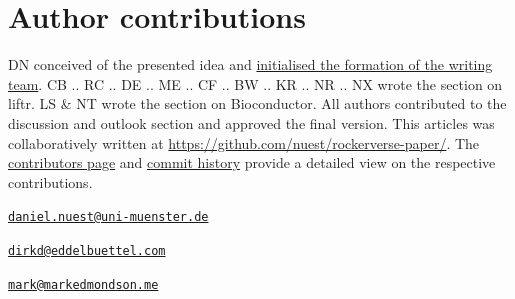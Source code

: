 \hypertarget{author-contributions}{%
\section{Author contributions}\label{author-contributions}}

DN conceived of the presented idea and
\href{https://github.com/nuest/rockerverse-paper/issues/3}{initialised the formation of the writing team}.
CB .. RC .. DE .. ME .. CF .. BW .. KR .. NR .. NX wrote the section on
liftr. LS \& NT wrote the section on Bioconductor. All authors
contributed to the discussion and outlook section and approved the final
version. This articles was collaboratively written at
\href{https://github.com/nuest/rockerverse-paper/}{https://github.com/nuest/rockerverse-paper/}.
The
\href{https://github.com/nuest/rockerverse-paper/graphs/contributors}{contributors page}
and
\href{https://github.com/nuest/rockerverse-paper/commits/master}{commit history}
provide a detailed view on the respective contributions.




\address{%
Daniel Nüst\\
Institute for Geoinformatics, University of Münster\\
Heisenbergstr. 2, 48149 Münster, Germany\\
}
\href{mailto:daniel.nuest@uni-muenster.de}{\nolinkurl{daniel.nuest@uni-muenster.de}}

\address{%
Carl Boettiger\\
\\
\\
}


\address{%
Robrecht Cannoodt\\
\\
\\
}


\address{%
Dirk Eddelbuettel\\
University of Illinois at Urbana-Champaign\\
Department of Statistics\\ Illini Hall, 725 S Wright St\\ Champaign, IL 61820\\ ORCiD \href{https://orcid.org/0000-0001-6419-907X}{0000-0001-6419-907X}\\
}
\href{mailto:dirkd@eddelbuettel.com}{\nolinkurl{dirkd@eddelbuettel.com}}

\address{%
Mark Edmondson\\
IIH Nordic A/S, Google Developer Expert for GCP\\
\\
}
\href{mailto:mark@markedmondson.me}{\nolinkurl{mark@markedmondson.me}}

